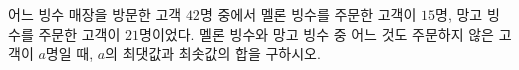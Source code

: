어느 빙수 매장을 방문한 고객 $42$명 중에서 멜론 빙수를 주문한 고객이 $15$명, 망고 빙수를 주문한 고객이 $21$명이었다. 멜론 빙수와 망고 빙수 중 어느 것도 주문하지 않은 고객이 $a$명일 때, $a$의 최댓값과 최솟값의 합을 구하시오.
